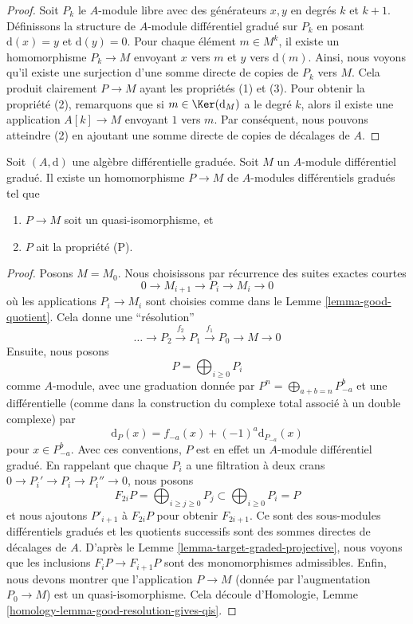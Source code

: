 \begin{proof}
Soit $P_k$ le $A$-module libre avec des générateurs $x, y$ en degrés $k$ et $k +
1$. Définissons la structure de $A$-module différentiel gradué sur $P_k$ en
posant $\text{d}(x) = y$ et $\text{d}(y) = 0$. Pour chaque élément $m \in M^k$, il
existe un homomorphisme $P_k \to M$ envoyant $x$ vers $m$ et $y$ vers
$\text{d}(m)$. Ainsi, nous voyons qu'il existe une surjection d'une somme directe
de copies de $P_k$ vers $M$. Cela produit clairement $P \to M$ ayant les
propriétés (1) et (3). Pour obtenir la propriété (2), remarquons que si $m \in
\Ker(\text{d}_M)$ a le degré $k$, alors il existe une application $A[k] \to M$
envoyant $1$ vers $m$. Par conséquent, nous pouvons atteindre (2) en ajoutant une
somme directe de copies de décalages de $A$.
\end{proof}

\begin{lemma}
\label{lemma-resolve}
Soit $(A, \text{d})$ une algèbre différentielle graduée. Soit $M$ un $A$-module
différentiel gradué. Il existe un homomorphisme $P \to M$ de $A$-modules
différentiels gradués tel que
\begin{enumerate}
\item $P \to M$ soit un quasi-isomorphisme, et
\item $P$ ait la propriété (P).
\end{enumerate}
\end{lemma}

\begin{proof}
Posons $M = M_0$. Nous choisissons par récurrence des suites exactes courtes
$$
0 \to M_{i + 1} \to P_i \to M_i \to 0
$$
où les applications $P_i \to M_i$ sont choisies comme dans le Lemme
\ref{lemma-good-quotient}. Cela donne une ``résolution''
$$
\ldots \to P_2 \xrightarrow{f_2} P_1 \xrightarrow{f_1} P_0 \to M \to 0
$$
Ensuite, nous posons
$$
P = \bigoplus\nolimits_{i \geq 0} P_i
$$
comme $A$-module, avec une graduation donnée par $P^n = \bigoplus_{a + b = n}
P_{-a}^b$ et une différentielle (comme dans la construction du complexe total
associé à un double complexe) par
$$
\text{d}_P(x) = f_{-a}(x) + (-1)^a \text{d}_{P_{-a}}(x)
$$
pour $x \in P_{-a}^b$. Avec ces conventions, $P$ est en effet un $A$-module
différentiel gradué. En rappelant que chaque $P_i$ a une filtration à deux crans
$0 \to P_i' \to P_i \to P_i'' \to 0$, nous posons
$$
F_{2i}P = \bigoplus\nolimits_{i \geq j \geq 0} P_j
\subset
\bigoplus\nolimits_{i \geq 0} P_i = P
$$
et nous ajoutons $P'_{i + 1}$ à $F_{2i}P$ pour obtenir $F_{2i + 1}$. Ce sont des
sous-modules différentiels gradués et les quotients successifs sont des sommes
directes de décalages de $A$. D'après le Lemme
\ref{lemma-target-graded-projective}, nous voyons que les inclusions $F_iP \to
F_{i + 1}P$ sont des monomorphismes admissibles. Enfin, nous devons montrer que
l'application $P \to M$ (donnée par l'augmentation $P_0 \to M$) est un
quasi-isomorphisme. Cela découle d'Homologie, Lemme
\ref{homology-lemma-good-resolution-gives-qis}.
\end{proof}





